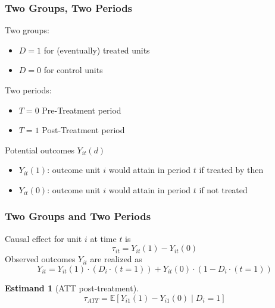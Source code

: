 \documentclass[xcolor=dvipsnames]{beamer}
\newcommand\E{\mathbb{E}}
\newtheorem{estm}{Estimand}
\begin{document}
\begin{frame}
  \frametitle{Two Groups, Two Periods}
\begin{Definition}
Two groups:
\footnotesize
\begin{itemize}
\item $D=1$ for (eventually) treated units
\item $D=0$ for control units
\end{itemize}\medskip
\small
Two periods:
\footnotesize
\begin{itemize}
\item $T=0$ Pre-Treatment period
\item $T=1$ Post-Treatment period
\end{itemize}\medskip
\small
Potential outcomes $Y_{it}(d)$
\footnotesize
\begin{itemize}
\item $Y_{it}(1)$: outcome unit $i$ would attain in period $t$ if treated by then
\item $Y_{it}(0)$: outcome unit $i$ would attain in period $t$ if not treated
\end{itemize}
\end{Definition}
\end{frame}

\begin{frame}
  \frametitle{Two Groups and Two Periods}
\begin{Definition}
Causal effect for unit $i$ at time $t$ is
\footnotesize
$$\tau_{it}=Y_{it}(1)-Y_{it}(0)$$
\small
\medskip
Observed outcomes $Y_{it}$ are realized as
\footnotesize
$$Y_{it}=Y_{it}(1)\cdot (D_i\cdot (t=1))+Y_{it}(0)\cdot (1-D_i\cdot (t=1))$$
\end{Definition}
\small
\begin{estm}[ATT post-treatment]
$$\tau_{ATT}=\E[Y_{i1}(1)-Y_{i1}(0)\mid D_i=1]$$
\end{estm}
\end{frame}
\end{document}
